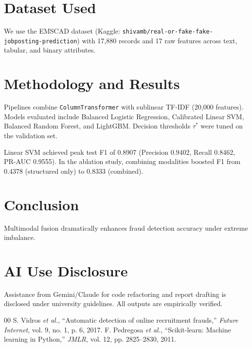 \documentclass[conference]{IEEEtran}
\begin{document}
\section{Dataset Used}
We use the EMSCAD dataset (Kaggle: \texttt{shivamb/real-or-fake-fake-jobposting-prediction}) with 17,880 records and 17 raw features across text, tabular, and binary attributes.

\section{Methodology and Results}
Pipelines combine \texttt{ColumnTransformer} with sublinear TF-IDF (20,000 features). Models evaluated include Balanced Logistic Regression, Calibrated Linear SVM, Balanced Random Forest, and LightGBM. Decision thresholds $\tau^*$ were tuned on the validation set.

Linear SVM achieved peak test F1 of 0.8907 (Precision 0.9402, Recall 0.8462, PR-AUC 0.9555). In the ablation study, combining modalities boosted F1 from 0.4378 (structured only) to 0.8333 (combined).

\section{Conclusion}
Multimodal fusion dramatically enhances fraud detection accuracy under extreme imbalance.

\section*{AI Use Disclosure}
Assistance from Gemini/Claude for code refactoring and report drafting is disclosed under university guidelines. All outputs are empirically verified.

\begin{thebibliography}{00}
 S. Vidros \textit{et al.}, ``Automatic detection of online recruitment frauds,'' \textit{Future Internet}, vol. 9, no. 1, p. 6, 2017.
 F. Pedregosa \textit{et al.}, ``Scikit-learn: Machine learning in Python,'' \textit{JMLR}, vol. 12, pp. 2825--2830, 2011.
\end{thebibliography}
\end{document}
